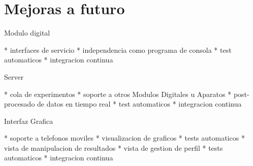 \section{Mejoras a futuro}




Modulo digital

* interfaces de servicio
* independencia como programa de consola
* test automaticos
* integracion continua

Server

* cola de experimentos
* soporte a otros Modulos Digitales u Aparatos
* post-procesado de datos en tiempo real
* test automaticos
* integracion continua

Interfaz Grafica

* soporte a telefonos moviles
* visualizacion de graficos
* tests automaticos
* vista de manipulacion de resultados
* vista de gestion de perfil
* tests automaticos
* integracion continua

